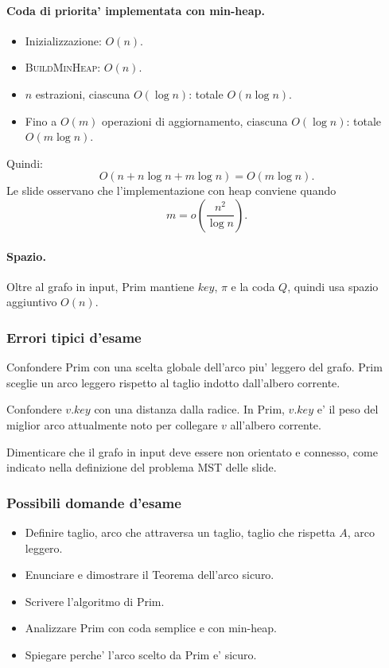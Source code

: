 \paragraph{Coda di priorita' implementata con min-heap.}
\begin{itemize}
	\item Inizializzazione: $O(n)$.
	\item \textsc{BuildMinHeap}: $O(n)$.
	\item $n$ estrazioni, ciascuna $O(\log n)$: totale $O(n\log n)$.
	\item Fino a $O(m)$ operazioni di aggiornamento, ciascuna $O(\log n)$: totale $O(m\log n)$.
\end{itemize}
Quindi:
\[
O(n+n\log n+m\log n)=O(m\log n).
\]
Le slide osservano che l'implementazione con heap conviene quando
\[
m=o\!\left(\frac{n^2}{\log n}\right).
\]

\paragraph{Spazio.}
Oltre al grafo in input, Prim mantiene $key$, $\pi$ e la coda $Q$, quindi usa spazio aggiuntivo $O(n)$.

\subsubsection{Errori tipici d'esame}
\begin{hardnote}
Confondere Prim con una scelta globale dell'arco piu' leggero del grafo. Prim sceglie un arco leggero rispetto al taglio indotto dall'albero corrente.
\end{hardnote}

\begin{hardnote}
Confondere $v.key$ con una distanza dalla radice. In Prim, $v.key$ e' il peso del miglior arco attualmente noto per collegare $v$ all'albero corrente.
\end{hardnote}

\begin{hardnote}
Dimenticare che il grafo in input deve essere non orientato e connesso, come indicato nella definizione del problema MST delle slide.
\end{hardnote}

\subsubsection{Possibili domande d'esame}
\begin{itemize}
	\item Definire taglio, arco che attraversa un taglio, taglio che rispetta $A$, arco leggero.
	\item Enunciare e dimostrare il Teorema dell'arco sicuro.
	\item Scrivere l'algoritmo di Prim.
	\item Analizzare Prim con coda semplice e con min-heap.
	\item Spiegare perche' l'arco scelto da Prim e' sicuro.
\end{itemize}

